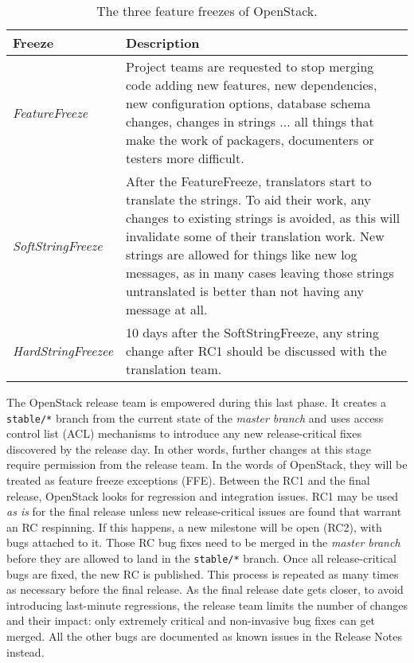 \begin{table}
\centering
\renewcommand{\arraystretch}{1.3}
\caption{The three feature freezes of OpenStack.\label{t:3freezes}}
\begin{tabularx}{\textwidth}[]{
m{}
m{}
}
\toprule
Freeze & Description \\
\midrule 
\emph{FeatureFreeze} & Project teams are requested to stop merging code adding new features, new dependencies, new configuration options, database schema changes, changes in strings ... all things that make the work of packagers, documenters or testers more difficult. \\
\emph{SoftStringFreeze} &  After the FeatureFreeze, translators start to translate the strings. To aid their work, any changes to existing strings is avoided, as this will invalidate some of their translation work. New strings are allowed for things like new log messages, as in many cases leaving those strings untranslated is better than not having any message at all.\\
\emph{HardStringFreezee} & 10 days after the SoftStringFreeze,  any string change after RC1 should be discussed with the translation team.\\
\bottomrule
\end{tabularx}
\end{table}


The OpenStack release team is empowered during this last phase. It creates a \texttt{stable/*} branch from the current state of the \emph{master branch} and uses access control list (ACL) mechanisms to introduce any new release-critical fixes discovered by the release day.  In other words, further changes at this stage require permission from the release team. In the words of OpenStack, they will be treated as feature freeze exceptions (FFE). Between the RC1 and the final release, OpenStack looks for regression and integration issues. RC1 may be used \emph{as is} for the final release unless new release-critical issues are found that warrant an RC respinning. If this happens, a new milestone will be open (RC2), with bugs attached to it. Those RC bug fixes need to be merged in the \emph{master branch} before they are allowed to land in the \texttt{stable/*}  branch. Once all release-critical bugs are fixed, the new RC is published. This process is repeated as many times as necessary before the final release. As the final release date gets closer, to avoid introducing last-minute regressions, the release team limits the number of changes and their impact: only extremely critical and non-invasive bug fixes can get merged. All the other bugs are documented as known issues in the Release Notes instead. 

